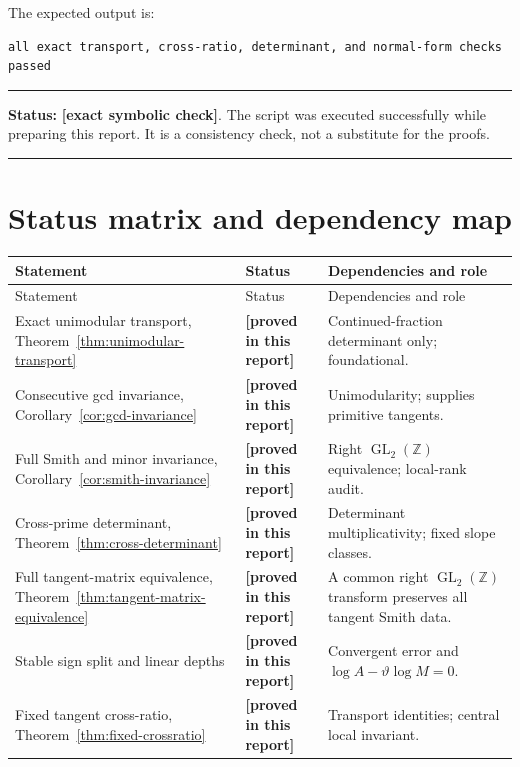 \documentclass[11pt,oneside]{article}
\theoremstyle{definition}
\theoremstyle{remark}
\newcommand{\Z}{\mathbb Z}
\newcommand{\thetaq}{\vartheta}
\newcommand{\GL}{\operatorname{GL}}
\newcommand{\provedhere}{\textcolor{proofgreen}{\textbf{[proved in this report]}}}
\newcommand{\exactcheck}{\textcolor{exactviolet}{\textbf{[exact symbolic check]}}}
\newenvironment{statusbox}[1]
{\begin{center}\begin{minipage}{0.94\textwidth}\raggedright\hrule\vspace{0.45em}\textbf{Status:} #1\par\vspace{0.35em}}
{\vspace{0.35em}\hrule\end{minipage}\end{center}}
\begin{document}
The expected output is:
\begin{verbatim}
all exact transport, cross-ratio, determinant, and normal-form checks passed
\end{verbatim}

\begin{statusbox}{\exactcheck.  The script was executed successfully while preparing this
report.  It is a consistency check, not a substitute for the proofs.}
\end{statusbox}

\section{Status matrix and dependency map}
\label{sec:status}

\begin{longtable}{@{}p{}p{}p{}@{}}
\toprule
Statement & Status & Dependencies and role\\
\midrule
\endfirsthead
\toprule
Statement & Status & Dependencies and role\\
\midrule
\endhead
Exact unimodular transport, Theorem~\ref{thm:unimodular-transport}
& \provedhere
& Continued-fraction determinant only; foundational.\\

Consecutive gcd invariance, Corollary~\ref{cor:gcd-invariance}
& \provedhere
& Unimodularity; supplies primitive tangents.\\

Full Smith and minor invariance, Corollary~\ref{cor:smith-invariance}
& \provedhere
& Right $\GL_2(\Z)$ equivalence; local-rank audit.\\

Cross-prime determinant, Theorem~\ref{thm:cross-determinant}
& \provedhere
& Determinant multiplicativity; fixed slope classes.\\

Full tangent-matrix equivalence, Theorem~\ref{thm:tangent-matrix-equivalence}
& \provedhere
& A common right $\GL_2(\Z)$ transform preserves all tangent Smith data.\\

Stable sign split and linear depths
& \provedhere
& Convergent error and $\log A-\thetaq\log M=0$.\\

Fixed tangent cross-ratio, Theorem~\ref{thm:fixed-crossratio}
& \provedhere
& Transport identities; central local invariant.\\


\end{longtable}
\end{document}

